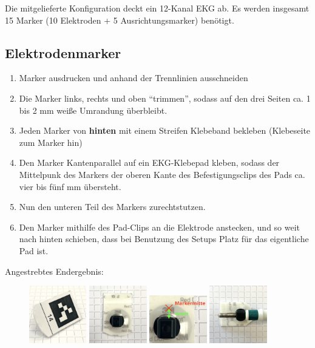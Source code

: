 \documentclass[a4paper, 10pt]{article}
\begin{document}
\noindent Die mitgelieferte Konfiguration deckt ein 12-Kanal EKG ab. Es werden insgesamt 15 Marker (10 Elektroden + 5 Ausrichtungsmarker) benötigt.

\subsection{Elektrodenmarker}
\label{ssec:electrode-markers}
\begin{enumerate}
    \item Marker ausdrucken und anhand der Trennlinien ausschneiden
    \item Die Marker links, rechts und oben \enquote{trimmen}, sodass auf den drei Seiten ca. 1 bis 2 mm weiße Umrandung überbleibt.
    \item Jeden Marker von \textbf{hinten} mit einem Streifen Klebeband bekleben (Klebeseite zum Marker hin)
    \item Den Marker Kantenparallel auf ein EKG-Klebepad kleben, sodass der Mittelpunk des Markers der oberen Kante des Befestigungsclips des Pads ca. vier bis fünf mm übersteht.
    \item Nun den unteren Teil des Markers zurechtstutzen.
    \item Den Marker mithilfe des Pad-Clips an die Elektrode anstecken, und so weit nach hinten schieben, dass bei Benutzung des Setups Platz für das eigentliche Pad ist.
\end{enumerate}

Angestrebtes Endergebnis:
\begin{figure}[H]
    \centering
    \includegraphics[width=2.5cm]{marker-front.png}
    \hspace*{5mm}
    \includegraphics[width=2.5cm]{marker-back.png}
    \hspace*{5mm}
    \includegraphics[width=2.5cm]{marker-back-zoomed.png}
    \hspace*{5mm}
    \includegraphics[width=2.5cm]{marker-attatched.png}
\end{figure}
\end{document}
